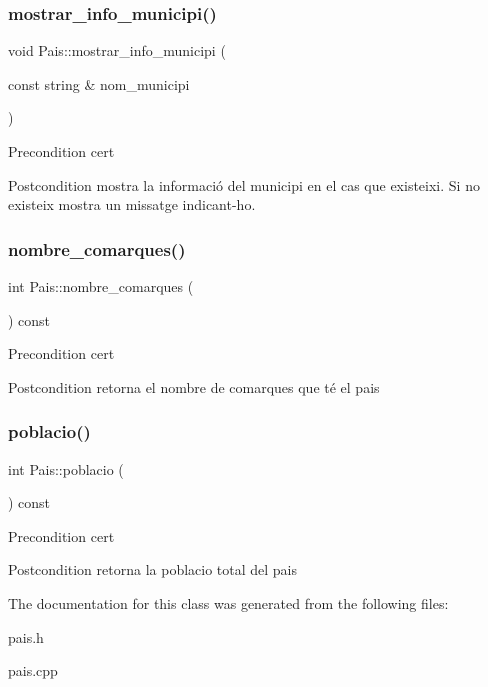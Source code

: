 \subsubsection{\texorpdfstring{mostrar\+\_\+info\+\_\+municipi()}{mostrar\_info\_municipi()}}
{\footnotesize\ttfamily void Pais\+::mostrar\+\_\+info\+\_\+municipi (\begin{DoxyParamCaption}\item[{const string \&}]{nom\+\_\+municipi }\end{DoxyParamCaption})}

\begin{DoxyPrecond}{Precondition}
cert 
\end{DoxyPrecond}
\begin{DoxyPostcond}{Postcondition}
mostra la informació del municipi en el cas que existeixi. Si no existeix mostra un missatge indicant-\/ho. 
\end{DoxyPostcond}
\mbox{\label{classPais_a67169ad4c8069867327eac695462f89c}} 
\subsubsection{\texorpdfstring{nombre\+\_\+comarques()}{nombre\_comarques()}}
{\footnotesize\ttfamily int Pais\+::nombre\+\_\+comarques (\begin{DoxyParamCaption}{ }\end{DoxyParamCaption}) const}

\begin{DoxyPrecond}{Precondition}
cert 
\end{DoxyPrecond}
\begin{DoxyPostcond}{Postcondition}
retorna el nombre de comarques que té el pais 
\end{DoxyPostcond}
\mbox{\label{classPais_af640c7bb35f0fa4799c41ae7e4835cb5}} 
\subsubsection{\texorpdfstring{poblacio()}{poblacio()}}
{\footnotesize\ttfamily int Pais\+::poblacio (\begin{DoxyParamCaption}{ }\end{DoxyParamCaption}) const}

\begin{DoxyPrecond}{Precondition}
cert 
\end{DoxyPrecond}
\begin{DoxyPostcond}{Postcondition}
retorna la poblacio total del pais 
\end{DoxyPostcond}


The documentation for this class was generated from the following files\+:\begin{DoxyCompactItemize}
\item 
pais.\+h\item 
pais.\+cpp\end{DoxyCompactItemize}
